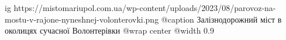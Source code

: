  
 
 
 
 

\ifcmt
  ig https://mistomariupol.com.ua/wp-content/uploads/2023/08/parovoz-na-mostu-v-rajone-nyneshnej-volonterovki.png
	@caption Залізнодорожний міст в околицях сучасної Волонтерівки
  @wrap center
  @width 0.9
\fi
